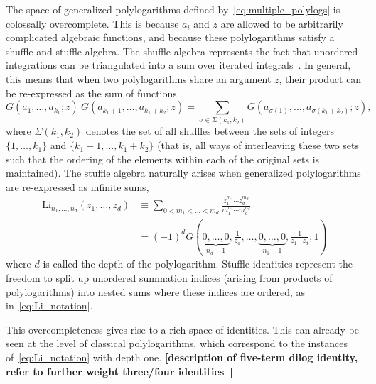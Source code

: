 \documentclass[11pt]{article}
\def\draftnote#1{{\bf [#1]}}
\begin{document}
The space of generalized polylogarithms defined by~\eqref{eq:multiple_polylogs} is colossally overcomplete. This is because $a_i$ and $z$ are allowed to be arbitrarily complicated algebraic functions, and because these polylogarithms satisfy a shuffle and stuffle algebra. The shuffle algebra represents the fact that unordered integrations can be triangulated into a sum over iterated integrals~\cite{Duhr:2011zq,Duhr:2014woa}. In general, this means that when two polylogarithms share an argument $z$, their product can be re-expressed as the sum of functions 
\begin{equation} \label{eq:shuffle_relation}
G(a_1,\dots,a_{k_1};z)\ G(a_{{k_1}+1},\dots,a_{k_1+k_2};z)  = \sum_{\sigma \in \Sigma(k_1,k_2)} G(a_{\sigma(1)},\dots,a_{\sigma(k_1+k_2)};z),
\end{equation}
where $\Sigma(k_1,k_2)$ denotes the set of all shuffles between the sets of integers $\{1,\dots,k_1\}$ and $\{k_1+1,\dots,k_1+k_2\}$ (that is, all ways of interleaving these two sets such that the ordering of the elements within each of the original sets is maintained). The stuffle algebra naturally arises when generalized polylogarithms are re-expressed as infinite sums, 
\begin{align} \label{eq:Li_notation}
\text{Li}_{n_1,\dots,n_d}(z_1,\dots, z_d) &\equiv \sum_{0 < m_1 < \dots < m_d} \frac{z_1^{m_1} \cdots z_d^{m_d}}{m_1^{n_1} \cdots m_d^{n_d}} \\
&= (-1)^d G(\underbrace{0,\dots,0}_{n_d-1},\frac{1}{z_d},\dots,\underbrace{0,\dots,0}_{n_1-1},\frac{1}{z_1 \cdots z_d}; 1) \nonumber
\end{align}
where $d$ is called the depth of the polylogarithm. Stuffle identities represent the freedom to split up unordered summation indices (arising from products of polylogarithms) into nested sums where these indices are ordered, as in~\eqref{eq:Li_notation}.

This overcompleteness gives rise to a rich space of identities. This can already be seen at the level of classical polylogarithms, which correspond to the instances of~\eqref{eq:Li_notation} with depth one.
\draftnote{description of five-term dilog identity, refer to further weight three/four identities~\cite{Golden:2013xva,GanglPolylogIdentities}}
\end{document}
